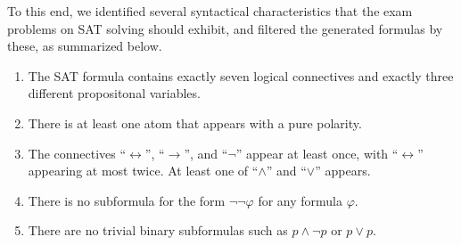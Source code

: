 To this end,
we identified several  syntactical characteristics that the exam problems on SAT solving should exhibit,
and filtered the generated formulas by these, as summarized  below. 
%
\begin{enumerate}
    \item
        The SAT formula contains exactly seven logical connectives 
        and exactly three different propositonal variables. 
    \item\label{item:polarity}
        There is at least one atom that appears with a pure polarity.
    \item
        The connectives ``$\leftrightarrow$'', ``$\rightarrow$'', and ``$\lnot$'' appear at least once,
        with ``$\leftrightarrow$'' appearing at most twice.
        At least one of ``$\land$'' and ``$\lor$'' appears.
    \item
        There is no subformula for the form $\lnot \lnot \varphi$ for any formula $\varphi$.
    \item
        There are no trivial binary subformulas such as $p \land \lnot p$ or $p \lor p$.

\end{enumerate}
